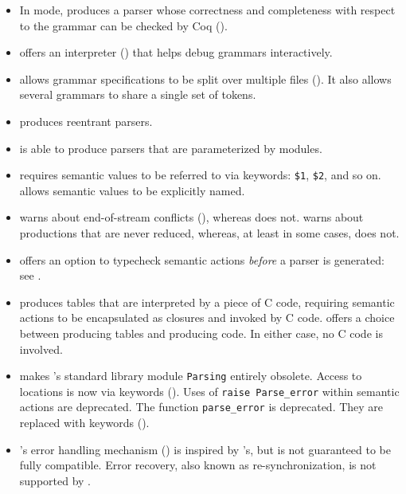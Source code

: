 \documentclass[onecolumn,11pt,nocopyrightspace,preprint]{sigplanconf}
\begin{document}
\begin{itemize}
\item In \ocoq mode, \menhir produces a parser whose correctness and
  completeness with respect to the grammar can be checked by Coq ().

\item \menhir offers an interpreter () that helps debug
      grammars interactively.

\item \menhir allows grammar specifications to be split over multiple files ().
      It also allows several grammars to share a single set of tokens.

\item \menhir produces reentrant parsers.

\item \menhir is able to produce parsers that are parameterized by \ocaml
      modules.

\item \ocamlyacc requires semantic values to be referred to via keywords: \verb+$1+,
      \verb+$2+, and so on. \menhir allows semantic values to be explicitly named.

\item \menhir warns about end-of-stream conflicts (), whereas
      \ocamlyacc does not. \menhir warns about productions that are never
      reduced, whereas, at least in some cases, \ocamlyacc does not.

\item \menhir offers an option to typecheck semantic actions \emph{before}
      a parser is generated: see \oinfer.

\item \ocamlyacc produces tables that are interpreted by a piece of C code,
      requiring semantic actions to be encapsulated as \ocaml closures and
      invoked by C code. \menhir offers a choice between producing tables
      and producing code. In either case, no C code is involved.

\item \menhir makes \ocaml's standard library module \texttt{Parsing}
      entirely obsolete. Access to locations is now via keywords
      ().  Uses of \verb+raise Parse_error+ within
      semantic actions are deprecated.  The function \verb+parse_error+ is
      deprecated. They are replaced with keywords ().

\item \menhir's error handling mechanism () is inspired
      by \ocamlyacc's, but is not guaranteed to be fully
      compatible. Error recovery, also known as re-synchronization, is not
      supported by \menhir.


\end{itemize}
\end{document}
